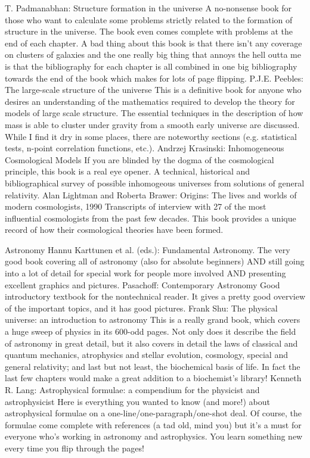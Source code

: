 \documentclass[10pt,a4paper]{book}
\theoremstyle{definition}
\begin{document}
T. Padmanabhan: Structure formation in the universe
A no-nonsense book for those who want to calculate some problems strictly related to the formation of structure in the universe.  The book even comes complete with problems at the end of each chapter.  A bad thing about this book is that there isn't any coverage on clusters of galaxies and the one really big thing that annoys the hell outta me is that the bibliography for each chapter is all combined in one big bibliography towards the end of the book which makes for lots of page flipping.
P.J.E. Peebles: The large-scale structure of the universe
This is a definitive book for anyone who desires an understanding of the mathematics required to develop the theory for models of large scale structure.  The essential techniques in the description of how mass is able to cluster under gravity from a smooth early universe are discussed.  While I find it dry in some places, there are noteworthy sections (e.g. statistical tests, n-point correlation functions, etc.).
Andrzej Krasinski: Inhomogeneous Cosmological Models
If you are blinded by the dogma of the cosmological principle, this book is a real eye opener.  A technical, historical and bibliographical survey of possible inhomogeous universes from solutions of general relativity.
Alan Lightman and Roberta Brawer: Origins: The lives and worlds of modern cosmologists, 1990
Transcripts of interview with 27 of the most influential cosmologists from the past few decades.  This book provides a unique record of how their cosmological theories have been formed.



Astronomy
Hannu Karttunen et al. (eds.): Fundamental Astronomy.
The very good book covering all of astronomy (also for absolute beginners) AND still going into a lot of detail for special work for people more involved AND presenting excellent graphics and pictures.
Pasachoff: Contemporary Astronomy
Good introductory textbook for the nontechnical reader.  It gives a pretty good overview of the important topics, and it has good pictures.
Frank Shu: The physical universe: an introduction to astronomy
This is a really grand book, which covers a huge sweep of physics in its 600-odd pages.  Not only does it describe the field of astronomy in great detail, but it also covers in detail the laws of classical and quantum mechanics, atrophysics and stellar evolution, cosmology, special and general relativity; and last but not least, the biochemical basis of life.  In fact the last few chapters would make a great addition to a biochemist's library!
Kenneth R. Lang: Astrophysical formulae: a compendium for the physicist and astrophysicist
Here is everything you wanted to know (and more!) about astrophysical formulae on a one-line/one-paragraph/one-shot deal.  Of course, the formulae come complete with references (a tad old, mind you) but it's a must for everyone who's working in astronomy and astrophysics.  You learn something new every time you flip through the pages!
\end{document}
